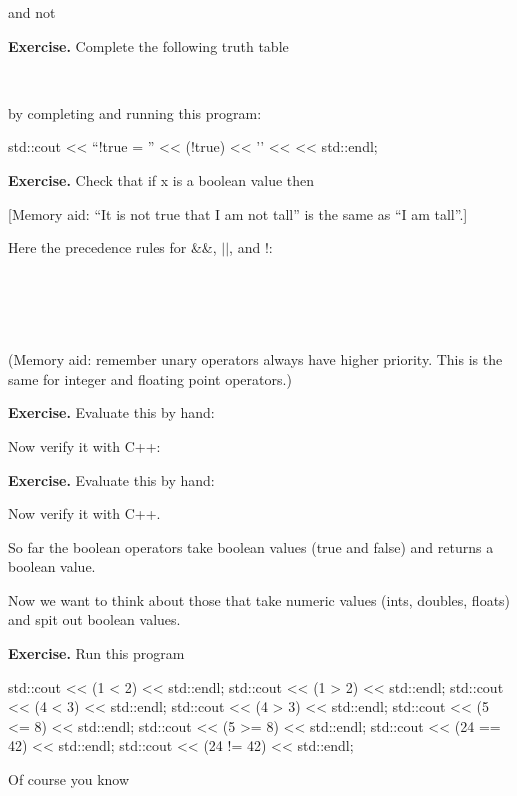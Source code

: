 {

and not


\textbf{Exercise.} Complete the following truth table

\\

by completing and running this program:
\begin{console}
std::cout <<  “!true = ” << (!true) << '\n'
          <<                  << std::endl;
\end{console}

\textbf{Exercise.} Check that if x is a boolean value then


[Memory aid: “It is not true that I am not tall” is the same as “I am tall”.]

Here the precedence rules for \&\&, $||$, and !:

\\
\tab[3em]{!}\\
\tab[3em]{\&\&}\\
\\

(Memory aid: remember unary operators always have higher priority.
This is the same for integer and floating point operators.)

\textbf{Exercise.} Evaluate this by hand:


Now verify it with C++:


\textbf{Exercise.} Evaluate this by hand:


Now verify it with C++.


So far the boolean operators take boolean values (true and false) and
returns a boolean value.

Now we want to think about those that take numeric values (ints,
doubles, floats) and spit out boolean values.

\textbf{Exercise.} Run this program
\begin{console}
std::cout << (1 < 2) << std::endl;
std::cout << (1 > 2) << std::endl;
std::cout << (4 < 3) << std::endl;
std::cout << (4 > 3) << std::endl;
std::cout << (5 <= 8) << std::endl;
std::cout << (5 >= 8) << std::endl;
std::cout << (24 == 42) << std::endl;
std::cout << (24 != 42) << std::endl;
\end{console}
Of course you know

}
